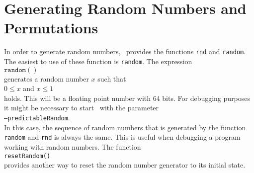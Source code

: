 \section{Generating Random Numbers and Permutations}
In order to generate random numbers, \setlx\ provides the functions \texttt{rnd} and
\texttt{random}.  The easiest to use of these function is \texttt{random}.  The expression
\\[0.2cm]
\hspace*{1.3cm}
$\texttt{random}()$
\\[0.2cm]
generates a random number $x$ such that 
\\[0.2cm]
\hspace*{1.3cm}
$0 \leq x$ \quad and \quad $x \leq 1$
\\[0.2cm]
holds.  This will be a floating point number with 64 bits.  For debugging purposes it might be necessary to start \setlx\ with
the parameter
\\[0.2cm]
\hspace*{1.3cm}
\texttt{--predictableRandom}.
\\[0.2cm]
In this case, the sequence of random numbers that is generated by the function \texttt{random} and
\texttt{rnd} is always the same.  This is useful when debugging a program working with
random numbers.  The function 
\\[0.2cm]
\hspace*{1.3cm}
\texttt{resetRandom()}
\\[0.2cm]
provides another way to reset the random number generator to its initial state.

